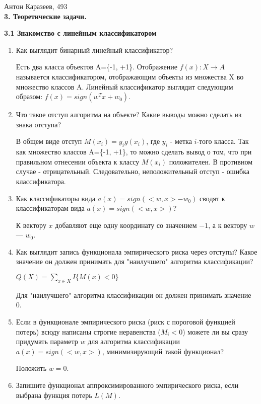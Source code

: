 \documentclass[12pt]{article}
\begin{document}
	Антон Каразеев, 493\\
	
	\textbf{3. Теоретические задачи.}
	
	\textbf{3.1 Знакомство с линейным классификатором}
	
	\begin{enumerate}
		\item Как выглядит бинарный линейный классификатор?
			
			Есть два класса объектов A=\{-1, +1\}. Отображение $f(x): X \rightarrow A$ называется классификатором, отображающим объекты из множества X во множество классов A. Линейный классификатор выглядит следующим образом: $f(x) = sign(w^Tx + w_0)$.
		
		\item Что такое отступ алгоритма на объекте? Какие выводы можно сделать из знака отступа?
			
			В общем виде отступ $M(x_i) = y_i g(x_i)$, где $y_i$ - метка $i$-того класса. Так как множество классов A=\{-1, +1\}, то можно сделать вывод о том, что при правильном отнесении объекта к классу $M(x_i)$ положителен. В противном случае - отрицательный. Следовательно, неположительный отступ - ошибка классификатора.
			
		\item Как классификаторы вида $a(x)=sign(<w,x> - w_0)$ сводят к классификаторам вида $a(x)=sign(<w,x>)$?
			
			К вектору $x$ добавляют еще одну координату со значением $-1$, а к вектору $w$ --- $w_0$.
			
		\item Как выглядит запись функционала эмпирического риска через отступы? Какое значение он должен принимать для "наилучшего" алгоритма классификации?
		
			$Q(X) = \sum_{x \in X} I\{M(x) < 0\}$
			
			Для "наилучшего" алгоритма классификации он должен принимать значение 0.
			
		\item Если в функционале эмпирического риска (риск с пороговой функцией потерь) всюду написаны строгие неравенства ($M_i < 0$) можете ли вы сразу  придумать параметр $w$ для алгоритма классификации $a(x) = sign(<w, x>)$, минимизирующий такой функционал?
		
			Положить $w=0$.
		
		\item Запишите функционал аппроксимированного эмпирического риска, если выбрана функция потерь $L(M)$.
		

\end{enumerate}
\end{document}
